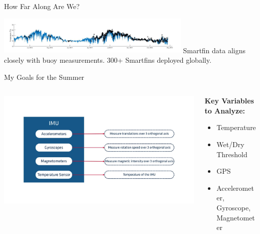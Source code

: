 \begin{frame}{How Far Along Are We?}
    \begin{center}
        \includegraphics[width=0.7\textwidth]{images/buoy_vs_smartfin_data.jpg}
        \vspace{1em}
        \small Smartfin data aligns closely with buoy measurements. 300+ Smartfins deployed globally.
    \end{center}
\end{frame}
\begin{frame}{My Goals for the Summer}
    \begin{columns}[c]
        \begin{column}{0.45\textwidth}
            \centering
            \includegraphics[width=0.85\linewidth]{images/imu-diagram.png}
        \end{column}
        \begin{column}{0.55\textwidth}
            \small
            \textbf{Key Variables to Analyze:}
            \begin{itemize}
                \item Temperature
                \item Wet/Dry Threshold
                \item GPS
                \item Accelerometer, Gyroscope, Magnetometer
            \end{itemize}
        \vspace{1em}           
        \end{column}
    \end{columns}
\end{frame}
